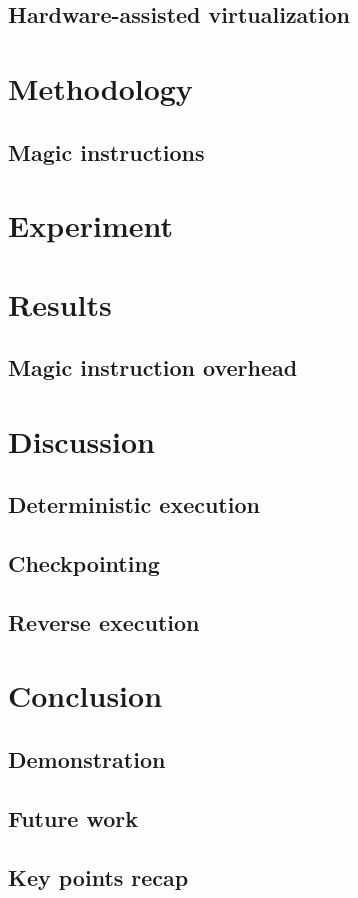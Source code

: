 \documentclass{beamer}
\begin{document}
        \subsection{Hardware-assisted virtualization}
        
        
                
	\section{Methodology}
	\subsection{Magic instructions}
	

	\section{Experiment}

	\section{Results}
	\subsection{Magic instruction overhead}
	

	\section{Discussion}
	\subsection{Deterministic execution}
	
	\subsection{Checkpointing}
	
	\subsection{Reverse execution}
	

	\section{Conclusion}
	\subsection{Demonstration}
	
	\subsection{Future work}
	
	\subsection{Key points recap}
	
\end{document}
